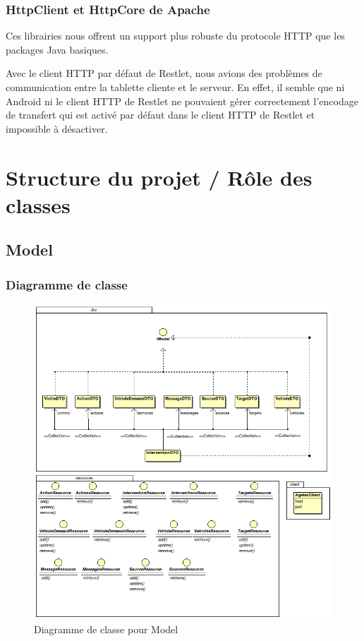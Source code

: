 \documentclass{article}
\begin{document}
\subsubsection{HttpClient et HttpCore de Apache}

Ces librairies nous offrent un support plus robuste du protocole HTTP que les packages Java basiques.

Avec le client HTTP par défaut de Restlet, nous avions des problèmes de communication entre la tablette cliente et le serveur. En effet, il semble que ni Android ni le client HTTP de Restlet ne pouvaient gérer correctement l’encodage de transfert qui est activé par défaut dans le client HTTP de Restlet et impossible à désactiver.

\section{Structure du projet / Rôle des classes}

\subsection{Model}

\subsubsection{Diagramme de classe}

\begin{figure}[htbp]
\begin{center}
\includegraphics[width=400pt]{doc_dev-fig001.png}
\caption{Diagramme de classe pour Model}
\label{1}
\end{center}
\end{figure}
\end{document}
